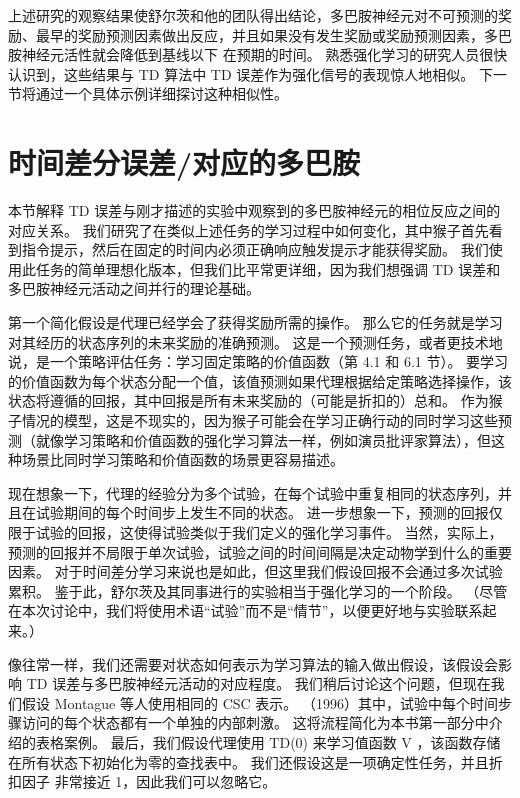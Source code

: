 {上述研究的观察结果使舒尔茨和他的团队得出结论，多巴胺神经元对不可预测的奖励、最早的奖励预测因素做出反应，并且如果没有发生奖励或奖励预测因素，多巴胺神经元活性就会降低到基线以下 在预期的时间。
熟悉强化学习的研究人员很快认识到，这些结果与 TD 算法中 TD 误差作为强化信号的表现惊人地相似。
下一节将通过一个具体示例详细探讨这种相似性。


\section{时间差分误差/对应的多巴胺} \label{sec:td_dopamine}

本节解释 TD 误差与刚才描述的实验中观察到的多巴胺神经元的相位反应之间的对应关系。
我们研究了在类似上述任务的学习过程中如何变化，其中猴子首先看到指令提示，然后在固定的时间内必须正确响应触发提示才能获得奖励。
我们使用此任务的简单理想化版本，但我们比平常更详细，因为我们想强调 TD 误差和多巴胺神经元活动之间并行的理论基础。


第一个简化假设是代理已经学会了获得奖励所需的操作。
那么它的任务就是学习对其经历的状态序列的未来奖励的准确预测。
这是一个预测任务，或者更技术地说，是一个策略评估任务：学习固定策略的价值函数（第 4.1 和 6.1 节）。
要学习的价值函数为每个状态分配一个值，该值预测如果代理根据给定策略选择操作，该状态将遵循的回报，其中回报是所有未来奖励的（可能是折扣的）总和。
作为猴子情况的模型，这是不现实的，因为猴子可能会在学习正确行动的同时学习这些预测（就像学习策略和价值函数的强化学习算法一样，例如演员批评家算法），但这种场景比同时学习策略和价值函数的场景更容易描述。


现在想象一下，代理的经验分为多个试验，在每个试验中重复相同的状态序列，并且在试验期间的每个时间步上发生不同的状态。
进一步想象一下，预测的回报仅限于试验的回报，这使得试验类似于我们定义的强化学习事件。
当然，实际上，预测的回报并不局限于单次试验，试验之间的时间间隔是决定动物学到什么的重要因素。
对于时间差分学习来说也是如此，但这里我们假设回报不会通过多次试验累积。
鉴于此，舒尔茨及其同事进行的实验相当于强化学习的一个阶段。
（尽管在本次讨论中，我们将使用术语“试验”而不是“情节”，以便更好地与实验联系起来。）


像往常一样，我们还需要对状态如何表示为学习算法的输入做出假设，该假设会影响 TD 误差与多巴胺神经元活动的对应程度。
我们稍后讨论这个问题，但现在我们假设 Montague 等人使用相同的 CSC 表示。
（1996）其中，试验中每个时间步骤访问的每个状态都有一个单独的内部刺激。
这将流程简化为本书第一部分中介绍的表格案例。
最后，我们假设代理使用 TD(0) 来学习值函数 V ，该函数存储在所有状态下初始化为零的查找表中。
我们还假设这是一项确定性任务，并且折扣因子 非常接近 1，因此我们可以忽略它。


}
